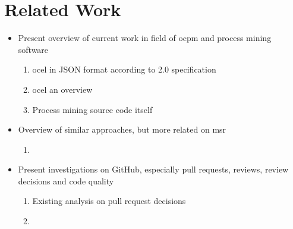 \chapter{Related Work}
\label{chap:related_work}
\begin{itemize}
	\item Present overview of current work in field of \ac{ocpm} and process mining software
	\begin{enumerate}
		\item \ac{ocel} in JSON format according to 2.0 specification \autocite{DBLP:journals/corr/abs-2403-01975}
		\item \ac{ocel} an overview \autocite{DBLP:conf/ictac/Aalst21a}
		\item Process mining source code itself \autocite{DBLP:journals/sp/ZhangLLZ20}
	\end{enumerate}
	\item Overview of similar approaches, but more related on \ac{msr}
	\begin{enumerate}
		\item 
	\end{enumerate}
	\item Present investigations on GitHub, especially pull requests, reviews, review decisions and code quality
	\begin{enumerate}
		\item Existing analysis on pull request decisions \autocite{DBLP:journals/tse/ZhangYGR23}
		\item
	\end{enumerate}
\end{itemize}

